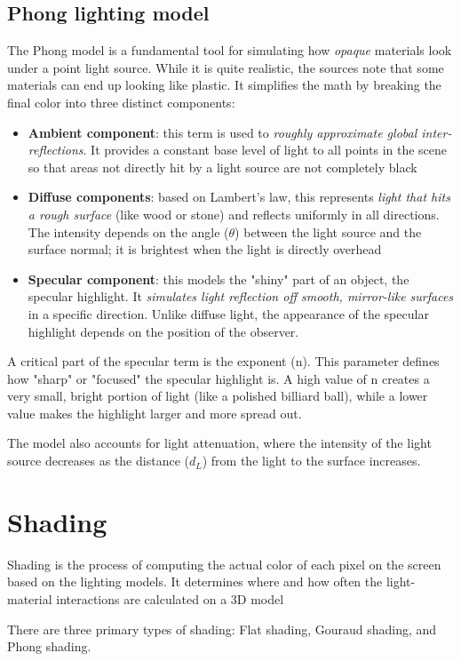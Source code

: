 \subsection{Phong lighting model}
The Phong model is a fundamental tool for simulating how \textit{opaque} materials look under a point light source. While it is quite realistic, the sources note that some materials can end up looking like plastic. It simplifies the math by breaking the final color into three distinct components:
\begin{itemize}[noitemsep]
    \item \textbf{Ambient component}: this term is used to \textit{roughly approximate global inter-reflections}. It provides a constant base level of light to all points in the scene so that areas not directly hit by a light source are not completely black
    \item \textbf{Diffuse components}: based on Lambert's law, this represents \textit{light that hits a rough surface} (like wood or stone) and reflects uniformly in all directions. The intensity depends on the angle (\(\theta\)) between the light source and the surface normal; it is brightest when the light is directly overhead
    \item \textbf{Specular component}: this models the "shiny" part of an object, the specular highlight. It \textit{simulates light reflection off smooth, mirror-like surfaces} in a specific direction. Unlike diffuse light, the appearance of the specular highlight depends on the position of the observer.
\end{itemize}

A critical part of the specular term is the exponent (n). This parameter defines how "sharp" or "focused" the specular highlight is. A high value of n creates a very small, bright portion of light (like a polished billiard ball), while a lower value makes the highlight larger and more spread out.\par
The model also accounts for light attenuation, where the intensity of the light source decreases as the distance (\(d_L\)) from the light to the surface increases.

\section{Shading}
\begin{definition}
    Shading is the process of computing the actual color of each pixel on the screen based on the lighting models. It determines where and how often the light-material interactions are calculated on a 3D model
\end{definition}
There are three primary types of shading: Flat shading, Gouraud shading, and Phong shading.

